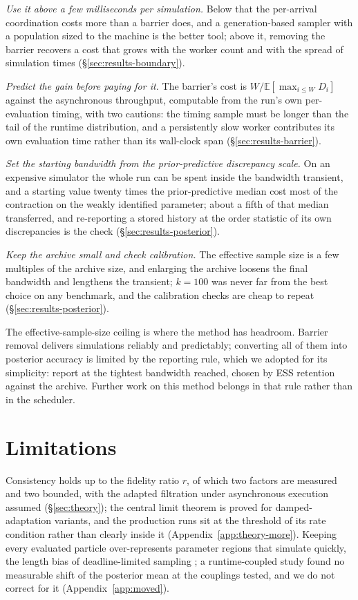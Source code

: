 \documentclass[10pt]{article}
\theoremstyle{plain}
\theoremstyle{definition}
\begin{document}
\emph{Use it above a few milliseconds per simulation.} Below that the per-arrival coordination costs more than a barrier does, and a generation-based sampler with a population sized to the machine is the better tool; above it, removing the barrier recovers a cost that grows with the worker count and with the spread of simulation times (\S\ref{sec:results-boundary}).

\emph{Predict the gain before paying for it.} The barrier's cost is $W/\mathbb{E}[\max_{i\le W}D_i]$ against the asynchronous throughput, computable from the run's own per-evaluation timing, with two cautions: the timing sample must be longer than the tail of the runtime distribution, and a persistently slow worker contributes its own evaluation time rather than its wall-clock span (\S\ref{sec:results-barrier}).

\emph{Set the starting bandwidth from the prior-predictive discrepancy scale.} On an expensive simulator the whole run can be spent inside the bandwidth transient, and a starting value twenty times the prior-predictive median cost most of the contraction on the weakly identified parameter; about a fifth of that median transferred, and re-reporting a stored history at the order statistic of its own discrepancies is the check (\S\ref{sec:results-posterior}).

\emph{Keep the archive small and check calibration.} The effective sample size is a few multiples of the archive size, and enlarging the archive loosens the final bandwidth and lengthens the transient; $k=100$ was never far from the best choice on any benchmark, and the calibration checks are cheap to repeat (\S\ref{sec:results-posterior}).

The effective-sample-size ceiling is where the method has headroom. Barrier removal delivers simulations reliably and predictably; converting all of them into posterior accuracy is limited by the reporting rule, which we adopted for its simplicity: report at the tightest bandwidth reached, chosen by ESS retention against the archive. Further work on this method belongs in that rule rather than in the scheduler.

\section{Limitations}\label{sec:limitations}
Consistency holds up to the fidelity ratio $r$, of which two factors are measured and two bounded, with the adapted filtration under asynchronous execution assumed (\S\ref{sec:theory}); the central limit theorem is proved for damped-adaptation variants, and the production runs sit at the threshold of its rate condition rather than clearly inside it (Appendix~\ref{app:theory-more}). Keeping every evaluated particle over-represents parameter regions that simulate quickly, the length bias of deadline-limited sampling \citep{murray2021anytime}; a runtime-coupled study found no measurable shift of the posterior mean at the couplings tested, and we do not correct for it (Appendix~\ref{app:moved}).
\end{document}
